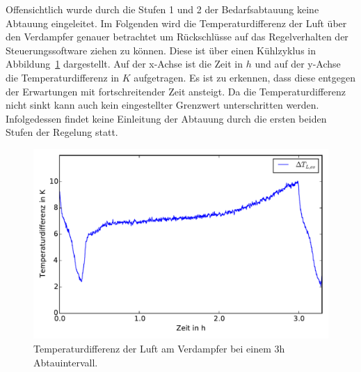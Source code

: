 Offensichtlich wurde durch die Stufen 1 und 2 der Bedarfsabtauung keine Abtauung eingeleitet. Im Folgenden wird die Temperaturdifferenz der Luft über den Verdampfer genauer betrachtet um Rückschlüsse auf das Regelverhalten der Steuerungssoftware ziehen zu können. Diese ist über einen Kühlzyklus in Abbildung~\ref{fig:deltaTLuftevap51} dargestellt. Auf der x-Achse ist die Zeit in $h$ und auf der y-Achse die Temperaturdifferenz in $K$ aufgetragen. Es ist zu erkennen, dass diese entgegen der Erwartungen mit fortschreitender Zeit ansteigt. Da die Temperaturdifferenz nicht sinkt kann auch kein eingestellter Grenzwert unterschritten werden. Infolgedessen findet keine Einleitung der Abtauung durch die ersten beiden Stufen der Regelung statt. 

\begin{figure}[h!]
\centering
\includegraphics[scale=0.8]{Pictures/51/delTaT_evap.pdf}
\caption{Temperaturdifferenz der Luft am Verdampfer bei einem 3h Abtauintervall.}
\label{fig:deltaTLuftevap51}
\end{figure}


